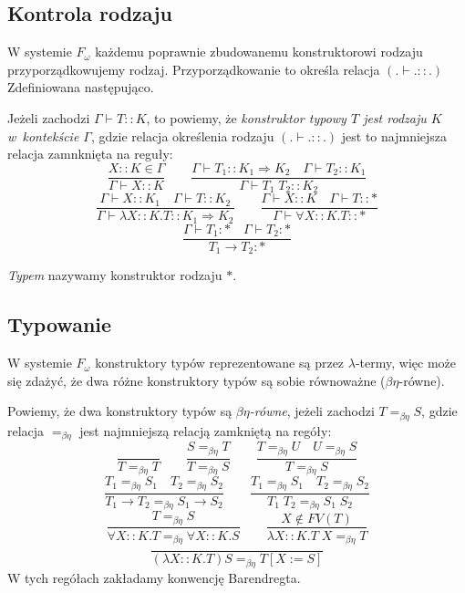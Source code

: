 \documentclass[11pt,leqno]{article}
\begin{document}
\subsection{Kontrola rodzaju}

W systemie $F_\omega$ każdemu poprawnie zbudowanemu konstruktorowi rodzaju przyporządkowujemy rodzaj.
Przyporządkowanie to określa relacja $(.\vdash.::.)$ Zdefiniowana następująco.

\begin{definicja}
	Jeżeli zachodzi $\Gamma \vdash T :: K$, to powiemy, że
	\emph {konstruktor typowy $T$ jest rodzaju $K$ w~kontekście $\Gamma$}, gdzie
	relacja określenia rodzaju $(.\vdash.::.)$
	jest to najmniejsza relacja zamnknięta na reguły:
	\[
		\frac{X::K \in \Gamma}{\Gamma \vdash X::K}
		\qquad
		\frac{\Gamma \vdash T_1 :: K_{1} \Rightarrow K_{2} \hspace{1em} \Gamma \vdash T_2 :: K_{1}}{\Gamma \vdash T_1\;T_2 :: K_{2}}
	\]
	\[
		\frac{\Gamma \vdash X :: K_1 \hspace{1em} \Gamma \vdash T :: K_2}{\Gamma \vdash \lambda X::K. T :: K_{1} \Rightarrow K_{2}}
		\qquad
		\frac{\Gamma \vdash X :: K \hspace{1em} \Gamma \vdash T :: \ast}{\Gamma \vdash \forall X::K. T :: \ast}
	\]
	\[
		\frac{\Gamma \vdash T_1 : \ast \hspace{1em} \Gamma \vdash T_2 : \ast}{T_1 \rightarrow T_2 : \ast}
	\]	
\end{definicja}

\begin{definicja}
\emph{Typem} nazywamy konstruktor rodzaju $\ast$.
\end{definicja}

\subsection{Typowanie}

W systemie $F_\omega$ konstruktory typów reprezentowane są przez $\lambda$-termy, więc może
się zdażyć, że dwa różne konstruktory typów są sobie równoważne ($\beta\eta$-równe).

\begin{definicja}
	Powiemy, że dwa konstruktory typów są \emph{$\beta\eta$-równe}, jeżeli zachodzi $T =_{\beta\eta} S$,
	gdzie relacja $=_{\beta\eta}$ jest najmniejszą relacją zamkniętą na regóły:
	\[
		\frac{}{T=_{\beta\eta}T}
		\qquad
		\frac{S=_{\beta\eta}T}{T=_{\beta\eta}S}
		\qquad
		\frac{T=_{\beta\eta}U \quad U=_{\beta\eta}S}{T=_{\beta\eta}S}
	\]
	\[
		\frac{T_1=_{\beta\eta}S_1 \quad T_2=_{\beta\eta}S_2}{T_1 \rightarrow T_2 =_{\beta\eta} S_1 \rightarrow S_2}
		\qquad
		\frac{T_1=_{\beta\eta}S_1 \quad T_2=_{\beta\eta}S_2}{T_1\;T_2 =_{\beta\eta} S_1\;S_2}
	\]
	\[
		\frac{T=_{\beta\eta}S}{\forall X::K.T =_{\beta\eta} \forall X::K.S}
		\qquad
		\frac{X \notin FV(T)}{\lambda X::K.T\;X =_{\beta\eta} T}
	\]
	\[
		\frac{}{(\lambda X::K.T)S =_{\beta\eta} T[X:=S]}
	\]	
	W tych regółach zakładamy konwencję Barendregta.
\end{definicja}
\end{document}
